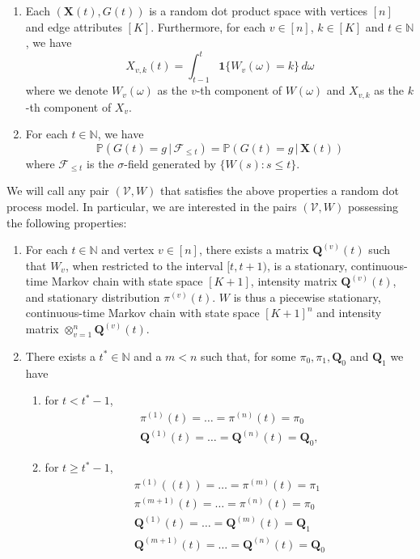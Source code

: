 \documentclass[10pt,journal,compsoc]{IEEEtran}
\theoremstyle{definition}
\begin{document}
\begin{enumerate}
\item Each $(\mathbf{X}(t), G(t))$ is a random dot product space with
  vertices $[n]$ and edge attributes $[K]$. Furthermore, for each $v
  \in [n]$, $k \in [K]$ and $t \in \mathbb{N}$, we have
  \begin{equation}
    \label{eq:54}
  X_{v,k}(t)  = \int_{t - 1}^{t}{ \mathbf{1}\{W_v(\omega) = k\}\, d\omega}
  \end{equation}
  where we denote $W_{v}(\omega)$ as the $v$-th component of $W(\omega)$ and
  $X_{v,k}$ as the $k$-th component of $X_v$.  
\item  For each $t \in \mathbb{N}$, we have
  \begin{equation}
    \label{eq:2}
    \mathbb{P}(G(t) = g \,|\, \mathscr{F}_{\leq t}) = \mathbb{P}(G(t)
    = g \,|\, \mathbf{X}(t))
  \end{equation}
where $\mathscr{F}_{\leq t}$ is the $\sigma$-field generated by $\{W(s)
  \colon s \leq t\}$.
\end{enumerate}
We will call any pair $(\mathscr{V}, W)$ that satisfies the above
properties a random dot process model. In particular, we are
interested in the pairs $(\mathscr{V}, W)$ possessing the following
properties:
\begin{enumerate}
\item For each $t \in \mathbb{N}$ and vertex $v \in [n]$, there exists
  a matrix $\mathbf{Q}^{(v)}(t)$ such that $W_v$, when restricted to
  the interval $[t, t+1)$, is a stationary, continuous-time Markov
  chain with state space $[K+1]$, intensity matrix
  ${\mathbf{Q}^{(v)}(t)}$, and stationary distribution
  $\pi^{(v)}(t)$. $W$ is thus a piecewise stationary, continuous-time
  Markov chain with state space $[K+1]^{n}$ and intensity matrix
  $\otimes_{v=1}^{n}\mathbf{Q}^{(v)}(t)$.
\item There exists a $t^{*} \in \mathbb{N}$ and a $m < n$ such that,
  for some $\pi_0, \pi_1, \mathbf{Q}_0$ and $\mathbf{Q}_1$ we have
  \begin{enumerate}
  \item for $t < t^{*} - 1$,
    \begin{gather*}
      \pi^{(1)}(t) = \dots = \pi^{(n)}(t) = \pi_0 \\
      \mathbf{Q}^{(1)}(t) = \dots = \mathbf{Q}^{(n)}(t) = \mathbf{Q}_0,
    \end{gather*}
  \item  for $t \geq t^{*} - 1$,
    \begin{gather*}
      \pi^{(1)}((t)) = \dots = \pi^{(m)}(t) = \pi_1 \\
      \pi^{(m+1)}(t)  = \dots = \pi^{(n)}(t) = \pi_0 \\
      \mathbf{Q}^{(1)}(t)  = \dots = \mathbf{Q}^{(m)}(t) = \mathbf{Q}_1 \\
      \mathbf{Q}^{(m+1)}(t) = \dots = \mathbf{Q}^{(n)}(t) = \mathbf{Q}_0 
    \end{gather*}
  \end{enumerate}
\end{enumerate}
\end{document}
